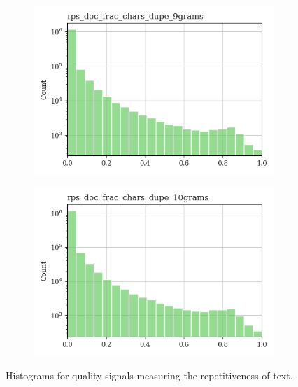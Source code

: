 \documentclass{article}
\begin{document}
\begin{figure}
\begin{subfigure}[b]{0.32\textwidth}
         \includegraphics[width=\textwidth]{figures/quality_signals/rps_doc_frac_chars_dupe_9grams.png}
     \end{subfigure}
     \hfill
     \begin{subfigure}[b]{0.32\textwidth}
         \centering
         \includegraphics[width=\textwidth]{figures/quality_signals/rps_doc_frac_chars_dupe_10grams.png}
     \end{subfigure}
    \caption{Histograms for quality signals measuring the repetitiveness of text.}
    \label{fig:rep-qs-dist}
\end{figure}
\end{document}
